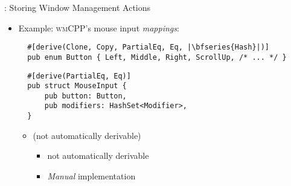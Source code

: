 \begin{frame}[fragile]{\underline{\cpp}: Storing Window Management Actions \hfill {\footnotesize \currentname}}


    \begin{itemize}

        \item Example: \textsc{wmCPP}'s mouse input \textit{mappings}:\\[3pt]
\begin{verbatim}
  #[derive(Clone, Copy, PartialEq, Eq, |\bfseries{Hash}|)]
  pub enum Button { Left, Middle, Right, ScrollUp, /* ... */ }
\end{verbatim}
\begin{verbatim}
  #[derive(PartialEq, Eq)]
  pub struct MouseInput {
      pub button: Button,
      pub modifiers: HashSet<Modifier>,
  }
\end{verbatim}

    \vspace*{5pt}\begin{itemize}

        \item {} (not automatically derivable)
            \begin{itemize}
                \item {} not automatically derivable
                \item \textit{Manual} implementation
            \end{itemize}

    \end{itemize}

    \end{itemize}

    \vfill

\end{frame}

